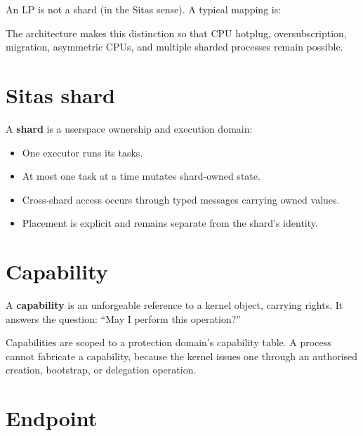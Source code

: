 An LP is not a shard (in the Sitas sense). A typical mapping is:

\begin{center}
\end{center}

The architecture makes this distinction so that CPU hotplug, oversubscription,
migration, asymmetric CPUs, and multiple sharded processes remain possible.

\section{Sitas shard}

A \textbf{shard} is a userspace ownership and execution domain:

\begin{itemize}
    \item One executor runs its tasks.
    \item At most one task at a time mutates shard-owned state.
    \item Cross-shard access occurs through typed messages carrying owned values.
    \item Placement is explicit and remains separate from the shard's identity.
\end{itemize}

\section{Capability}

A \textbf{capability} is an unforgeable reference to a kernel object, carrying
rights. It answers the question: ``May I perform this operation?''

Capabilities are scoped to a protection domain's capability table. A process
cannot fabricate a capability, because the kernel issues one through an authorised
creation, bootstrap, or delegation operation.

\section{Endpoint}


